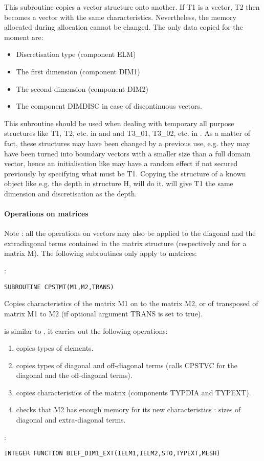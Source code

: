This subroutine copies a vector structure onto another. If  T1 is a vector, T2
then becomes a vector with the same characteristics. Nevertheless, the memory
allocated during allocation cannot be changed. The only data copied for the
moment are:
\begin{itemize}
  \item Discretisation type (component ELM)
  \item The first dimension (component DIM1)
  \item The second dimension (component DIM2)
  \item The component DIMDISC in case of discontinuous vectors.
\end{itemize}

This subroutine should be used when dealing with temporary all purpose
 structures like T1, T2, etc. in  and \sisyphe
and T3\_01, T3\_02, etc. in . As a matter of fact, these structures
may have been changed by a previous use, e.g. they may have been turned into
boundary vectors with a smaller size than a full domain vector, hence an
initialisation like  may have a random effect
if not secured previously by specifying what must be T1. Copying the structure
of a known object like e.g.  the depth in structure H, will do it.  will give T1 the same dimension and discretisation as the depth.

\paragraph{Operations on matrices}

Note : all the operations on vectors may also be applied to the diagonal and
the extradiagonal terms contained in the matrix structure (respectively
 and  for a matrix M). The following subroutines only
 apply to matrices:

:
\begin{lstlisting}[language=TelFortran]
SUBROUTINE CPSTMT(M1,M2,TRANS)
\end{lstlisting}

Copies characteristics of the matrix M1 on to the matrix M2, or of transposed
of matrix M1 to M2 (if optional argument TRANS is set to true).

 is similar to , it carries out the following
operations:
\begin{enumerate}
  \item copies types of elements.
  \item copies types of diagonal and off-diagonal terms (calls CPSTVC for the
    diagonal and the off-diagonal terms).
  \item copies characteristics of the matrix (components TYPDIA and TYPEXT).
  \item checks that M2 has enough memory for its new characteristics : sizes of
    diagonal and extra-diagonal terms.
\end{enumerate}
:
\begin{lstlisting}[language=TelFortran]
INTEGER FUNCTION BIEF_DIM1_EXT(IELM1,IELM2,STO,TYPEXT,MESH)
\end{lstlisting}

